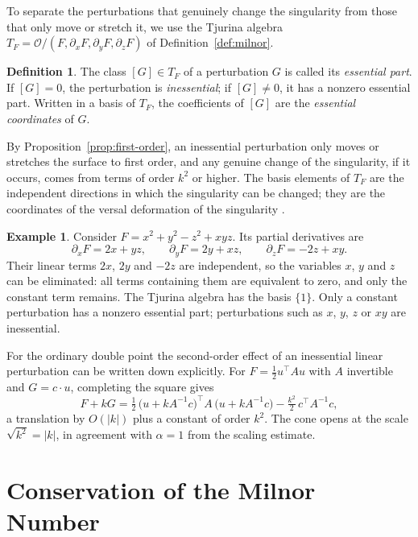 \documentclass[12pt, a4paper, oneside]{book}
\theoremstyle{plain}
\theoremstyle{definition}
\newtheorem{definition}[theorem]{Definition}
\newtheorem{example}[theorem]{Example}
\theoremstyle{remark}
\theoremstyle{definition}
\begin{document}
To separate the perturbations that genuinely change the singularity from those that only move or stretch it, we use the Tjurina algebra $T_F=\mathcal O/(F,\partial_xF,\partial_yF,\partial_zF)$ of Definition~\ref{def:milnor}.

\begin{definition}
\label{def:essential}
The class $[G]\in T_F$ of a perturbation $G$ is called its \emph{essential part}. If $[G]=0$, the perturbation is \emph{inessential}; if $[G]\neq0$, it has a nonzero essential part. Written in a basis of $T_F$, the coefficients of $[G]$ are the \emph{essential coordinates} of $G$.
\end{definition}

By Proposition~\ref{prop:first-order}, an inessential perturbation only moves or stretches the surface to first order, and any genuine change of the singularity, if it occurs, comes from terms of order $k^2$ or higher. The basis elements of $T_F$ are the independent directions in which the singularity can be changed; they are the coordinates of the versal deformation of the singularity \cite{greuel2007introduction,arnold1985singularities}.

\begin{example}
\label{ex:tjurina-A1}
Consider $F=x^2+y^2-z^2+xyz$. Its partial derivatives are
\[
\partial_xF=2x+yz,\qquad \partial_yF=2y+xz,\qquad\partial_zF=-2z+xy.
\]
Their linear terms $2x$, $2y$ and $-2z$ are independent, so the variables $x$, $y$ and $z$ can be eliminated: all terms containing them are equivalent to zero, and only the constant term remains. The Tjurina algebra has the basis $\{1\}$. Only a constant perturbation has a nonzero essential part; perturbations such as $x$, $y$, $z$ or $xy$ are inessential.
\end{example}

For the ordinary double point the second-order effect of an inessential linear perturbation can be written down explicitly. For $F=\frac12u^{\top}Au$ with $A$ invertible and $G=c\cdot u$, completing the square gives
\[
F+kG=\tfrac12\,\big(u+kA^{-1}c\big)^{\top}A\,\big(u+kA^{-1}c\big)-\tfrac{k^2}{2}\,c^{\top}A^{-1}c ,
\]
a translation by $O(|k|)$ plus a constant of order $k^2$. The cone opens at the scale $\sqrt{k^2}=|k|$, in agreement with $\alpha=1$ from the scaling estimate.

\section{Conservation of the Milnor Number}
\label{sec:conservation}
\end{document}
